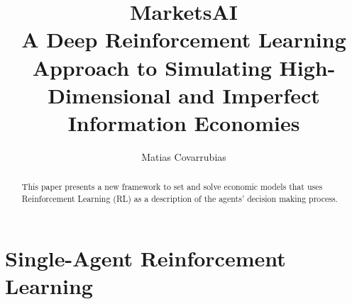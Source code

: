 \documentclass[11pt,english]{article}
\begin{document}
\title{MarketsAI\\
A Deep Reinforcement Learning Approach to Simulating High-Dimensional and Imperfect Information Economies}
\author{Matias Covarrubias}
\maketitle
\begin{abstract}
This paper presents a new framework to set and solve economic models
that uses Reinforcement Learning (RL) as a description of the agents'
decision making process. 
\end{abstract}

\section{Single-Agent Reinforcement Learning}
\end{document}
